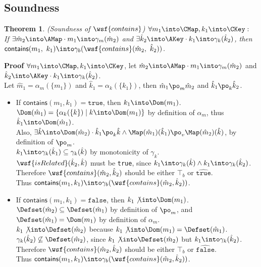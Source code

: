 \subsection{Soundness} \label{sec:soundness}
\newtheorem{thm}{Theorem}
\begin{thm} \normalfont
(\textit{Soundness of} $\wsf{contains}$)
$\forall m_1 \into \CMap, k_1 \into \CKey :$\\
If $\exists \hat{m}_2 \into \AMap \cdot m_1 \into \gamma_m(\hat{m}_2)$
and $\exists \hat{k}_2 \into \AKey \cdot k_1 \into \gamma_k(\hat{k}_2)$,
then $\textsf{contains}(m_1,\ k_1) \into \gamma_b(\wsf{contains}(\hat{m}_2,\ \hat{k}_2))$.
\end{thm}
\textbf{Proof } $\forall m_1 \into \CMap, k_1 \into \CKey$,
let $\hat{m}_2 \into \AMap \cdot m_1 \into \gamma_m(\hat{m}_2)$
and $\hat{k}_2 \into \AKey \cdot k_1 \into \gamma_k(\hat{k}_2)$.\\
Let $\hat{m}_1 = \alpha_m(\{ m_1 \})$ and $\hat{k}_1 = \alpha_k(\{ k_1 \})$,
then $\hat{m}_1 \po_m \hat{m}_2$ and $\hat{k}_1 \po_k \hat{k}_2$.
\begin{itemize}
\item If $\textsf{contains}(m_1, k_1) = \texttt{true}$, then $k_1 \into \Dom(m_1)$.\\
$\Dom(\hat{m}_1)  = \{ \alpha_k(\{k\}) \mid k \into \Dom(m_1) \}$
by definition of $\alpha_m$, thus $\hat{k}_1 \into \Dom(\hat{m}_1)$.\\
Also, $\exists \hat{k} \into \Dom(\hat{m}_2)
\cdot \hat{k}_1 \po_k \hat{k} \land \Map(\hat{m}_1)(\hat{k}_1) \po_v \Map(\hat{m}_2)(\hat{k})$,
by definition of $\po_m$.\\
$k_1 \into \gamma_k(\hat{k}_1) \subseteq \gamma_k(\hat{k})$ by monotonicity of $\gamma_k$.\\
$\wsf{isRelated}(\hat{k}_2, \hat{k})$ must be \texttt{true},
since $k_1 \into \gamma_k(\hat{k}) \land k_1 \into \gamma_k(\hat{k}_2)$. \\
Therefore $\wsf{contains}(\hat{m}_2, \hat{k}_2)$ should be either $\top_b$ or $\hat{\texttt{true}}$.\\
Thus $\textsf{contains}(m_1, k_1) \into \gamma_b(\wsf{contains}(\hat{m}_2, \hat{k}_2))$.
\item If $\textsf{contains}(m_1, k_1) = \texttt{false}$, then $k_1 \not\into \Dom(m_1)$.\\
$\Defset(\hat{m}_2) \subseteq \Defset(\hat{m}_1)$ by definition of $\po_m$,
and $\Defset(\hat{m}_1) = \Dom(m_1)$ by definition of $\alpha_m$.\\
$k_1 \not\into \Defset(\hat{m}_2)$ because $k_1 \not\into \Dom(m_1) = \Defset(\hat{m}_1)$. \\
$\gamma_k(\hat{k}_2) \not\subseteq \Defset(\hat{m}_2)$, since
$k_1 \not\into \Defset(\hat{m}_2)$ but $k_1 \into \gamma_k(\hat{k}_2)$.\\
Therefore $\wsf{contains}(\hat{m}_2, \hat{k}_2)$ should be either $\top_b$ or $\hat{\texttt{false}}$.\\
Thus $\textsf{contains}(m_1, k_1) \into \gamma_b(\wsf{contains}(\hat{m}_2, \hat{k}_2))$.
\end{itemize}


